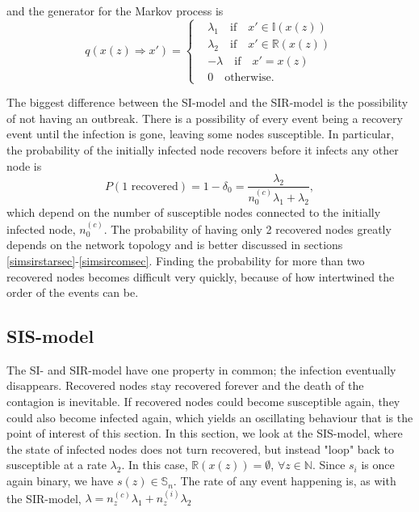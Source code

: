 \documentclass[12pt]{article} %
\numberwithin{equation}{section}
\begin{document}
and the generator for the Markov process is
\begin{equation}\label{qstarSIR}
    q(x(z)\Rightarrow x') = 
    \begin{cases}
    & \lambda_1 \quad \text{if} \quad x' \in \mathbb{I}(x(z)) \\
     & \lambda_2 \quad \text{if} \quad x' \in \mathbb{R}(x(z)) \\
    & -\lambda   \quad \text{if} \quad x' = x(z)\\
    & 0 \quad \text{otherwise.}
    \end{cases}
\end{equation}

The biggest difference between the SI-model and the SIR-model is the possibility of not having an outbreak. There is a possibility of every event being a recovery event until the infection is gone, leaving some nodes susceptible. In particular, the probability of the initially infected node recovers before it infects any other node is 
\begin{equation}\label{delta0}
    P(\text{1 recovered}) = 1-\delta_0 = \frac{\lambda_2}{n_0^{(c)}\lambda_1+\lambda_2},
\end{equation}
which depend on the number of susceptible nodes connected to the initially infected node, $n_0^{(c)}$. The probability of having only 2 recovered nodes greatly depends on the network topology and is better discussed in sections \ref{simsirstarsec}-\ref{simsircomsec}. Finding the probability for more than two recovered nodes becomes difficult very quickly, because of how intertwined the order of the events can be.
\subsection{SIS-model}\label{sis-model-section}
The SI- and SIR-model have one property in common; the infection eventually disappears. Recovered nodes stay recovered forever and the death of the contagion is inevitable. If recovered nodes could become susceptible again, they could also become infected again, which yields an oscillating behaviour that is the point of interest of this section. In this section, we look at the SIS-model, where the state of infected nodes does not turn recovered, but instead "loop" back to susceptible at a rate $\lambda_2$. In this case, $\mathbb{R}(x(z)) = \emptyset$, $\forall z\in \mathbb{N}$. Since $s_i$ is once again binary, we have $s(z) \in \mathbb{S}_n$. The rate of any event happening is, as with the SIR-model, $\lambda = n_z^{(c)}\lambda_1+n_z^{(i)}\lambda_2$
\end{document}
